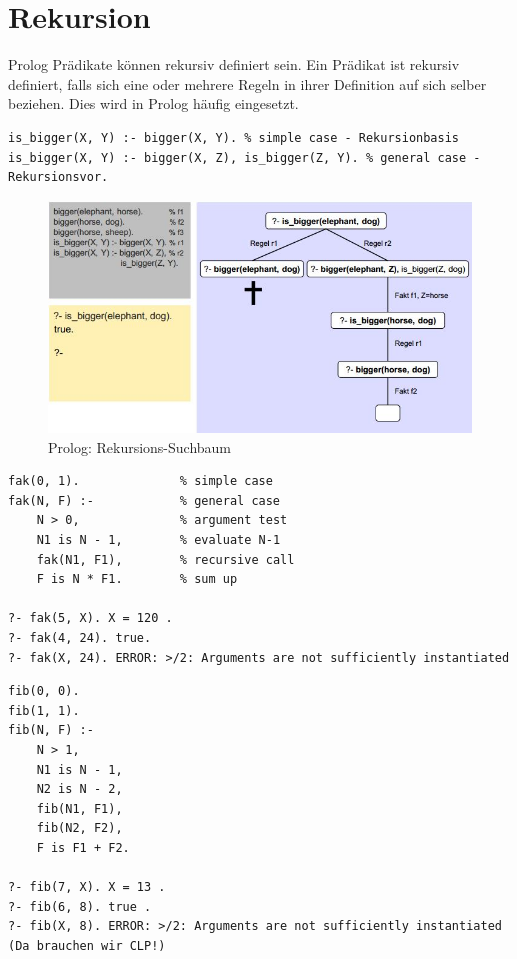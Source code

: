 \newpage
\section{Rekursion}
Prolog Prädikate können rekursiv definiert sein. Ein Prädikat ist rekursiv definiert, falls sich eine oder mehrere Regeln in ihrer Definition auf sich selber beziehen. Dies wird in Prolog häufig eingesetzt.

\begin{lstlisting}[caption=Beispiel Rekursion]
is_bigger(X, Y) :- bigger(X, Y). % simple case - Rekursionbasis
is_bigger(X, Y) :- bigger(X, Z), is_bigger(Z, Y). % general case - Rekursionsvor.
\end{lstlisting}

\begin{figure}[h!]
\centering
\includegraphics[width=0.7\linewidth]{fig/prolog-suchbaum-rekursion}
\caption{Prolog: Rekursions-Suchbaum}
\label{fig:prolog-suchbaum-rekursion}
\end{figure}

\begin{lstlisting}[caption=Fakultät]
fak(0, 1). 				% simple case
fak(N, F) :- 			% general case
	N > 0, 				% argument test
	N1 is N - 1, 		% evaluate N-1
	fak(N1, F1), 		% recursive call
	F is N * F1. 		% sum up

?- fak(5, X). X = 120 .
?- fak(4, 24). true.
?- fak(X, 24). ERROR: >/2: Arguments are not sufficiently instantiated
\end{lstlisting}

\begin{lstlisting}[caption=Fibonacci]
% Naive Implementierung! Optimierung mittels Endrekursion und Assertions.
fib(0, 0).
fib(1, 1).
fib(N, F) :-
	N > 1,
	N1 is N - 1,
	N2 is N - 2,
	fib(N1, F1),
	fib(N2, F2),
	F is F1 + F2.

?- fib(7, X). X = 13 .
?- fib(6, 8). true .
?- fib(X, 8). ERROR: >/2: Arguments are not sufficiently instantiated (Da brauchen wir CLP!)
\end{lstlisting}

